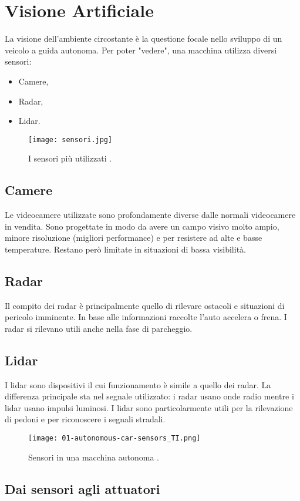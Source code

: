 \section{Visione Artificiale}
La visione dell'ambiente circostante è la questione focale nello sviluppo di un veicolo a guida autonoma. Per poter "vedere", una macchina utilizza diversi sensori:
\begin{itemize}
    \item  Camere,
    \item Radar,
    \item Lidar.
\end{itemize}
\begin{figure}[h]
    \texttt{[image: sensori.jpg]}
    \caption{I sensori più utilizzati \cite{lid}.}
    \label{fig:lid}
\end{figure}
\subsection{Camere}
Le videocamere utilizzate sono profondamente diverse dalle normali videocamere in vendita. Sono progettate in modo da avere un campo visivo molto ampio,
minore risoluzione (migliori performance) e per resistere ad alte  e basse temperature. Restano però limitate in situazioni di bassa visibilità.     
\subsection{Radar}
Il compito dei radar è principalmente quello di rilevare ostacoli e situazioni di pericolo imminente. In base alle informazioni raccolte l'auto accelera o frena. 
I radar si rilevano utili anche nella fase di parcheggio.
\subsection{Lidar}
I lidar sono dispositivi il cui funzionamento è simile a quello dei radar. La differenza principale sta nel segnale utilizzato: i radar usano onde radio mentre i lidar usano impulsi luminosi.
I lidar sono particolarmente utili per la rilevazione di pedoni e per riconoscere i segnali stradali.
\begin{figure}[h!]
    \texttt{[image: 01-autonomous-car-sensors\_TI.png]}
    \caption{Sensori in una macchina autonoma \cite{sensors}.}
    \label{fig:sensors}
\end{figure}
\newpage
\subsection{Dai sensori agli attuatori}

